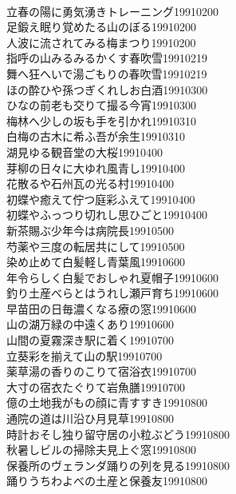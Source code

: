 \begin{multicols}{2}
\\立春の陽に勇気湧きトレーニング\hfill{19910200}
\\足鍛え眠り覚めたる山のぼる\hfill{19910200}
\\人波に流されてみる梅まつり\hfill{19910200}
\\指呼の山みるみるかくす春吹雪\hfill{19910219}
\\舞へ狂へいで湯ごもりの春吹雪\hfill{19910219}
\\ほの酔ひや孫つぎくれしお白酒\hfill{19910300}
\\ひなの前老も交りて撮る今宵\hfill{19910300}
\\梅林へ少しの坂も手を引かれ\hfill{19910310}
\\白梅の古木に希ふ吾が余生\hfill{19910310}
\\湖見ゆる観音堂の大桜\hfill{19910400}
\\芽柳の日々に大ゆれ風青し\hfill{19910400}
\\花散るや石州瓦の光る村\hfill{19910400}
\\初蝶や癒えて佇つ庭彩ふえて\hfill{19910400}
\\初蝶やふっつり切れし思ひごと\hfill{19910400}
\\新茶賜ぶ少年今は病院長\hfill{19910500}
\\芍薬や三度の転居共にして\hfill{19910500}
\\染め止めて白髪軽し青葉風\hfill{19910600}
\\年令らしく白髪でおしゃれ夏帽子\hfill{19910600}
\\釣り土産べらとはうれし瀬戸育ち\hfill{19910600}
\\早苗田の日毎濃くなる療の窓\hfill{19910600}
\\山の湖万緑の中遠くあり\hfill{19910600}
\\山間の夏霧深き駅に着く\hfill{19910700}
\\立葵彩を揃えて山の駅\hfill{19910700}
\\薬草湯の香りのこりて宿浴衣\hfill{19910700}
\\大寸の宿衣たぐりて岩魚膳\hfill{19910700}
\\億の土地我がもの顔に青すすき\hfill{19910800}
\\通院の道は川沿ひ月見草\hfill{19910800}
\\時計おそし独り留守居の小粒ぶどう\hfill{19910800}
\\秋暑しビルの掃除夫見上ぐ窓\hfill{19910800}
\\保養所のヴェランダ踊りの列を見る\hfill{19910800}
\\踊りうちわよべの土産と保養友\hfill{19910800}

\end{multicols}
